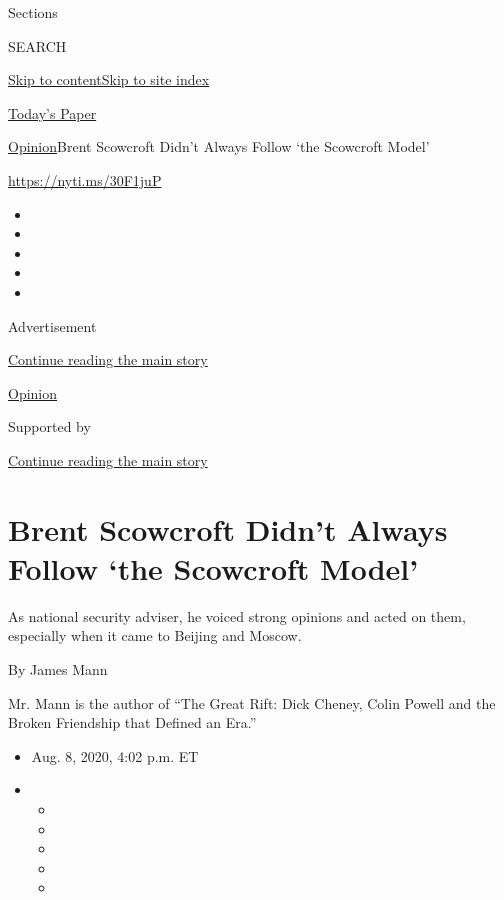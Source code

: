 Sections

SEARCH

\protect\hyperlink{site-content}{Skip to
content}\protect\hyperlink{site-index}{Skip to site index}

\href{https://myaccount.nytimes.com/auth/login?response_type=cookie\&client_id=vi}{}

\href{https://www.nytimes.com/section/todayspaper}{Today's Paper}

\href{/section/opinion}{Opinion}\textbar{}Brent Scowcroft Didn't Always
Follow `the Scowcroft Model'

\href{https://nyti.ms/30F1juP}{https://nyti.ms/30F1juP}

\begin{itemize}
\item
\item
\item
\item
\item
\end{itemize}

Advertisement

\protect\hyperlink{after-top}{Continue reading the main story}

\href{/section/opinion}{Opinion}

Supported by

\protect\hyperlink{after-sponsor}{Continue reading the main story}

\hypertarget{brent-scowcroft-didnt-always-follow-the-scowcroft-model}{%
\section{Brent Scowcroft Didn't Always Follow `the Scowcroft
Model'}\label{brent-scowcroft-didnt-always-follow-the-scowcroft-model}}

As national security adviser, he voiced strong opinions and acted on
them, especially when it came to Beijing and Moscow.

By James Mann

Mr. Mann is the author of ``The Great Rift: Dick Cheney, Colin Powell
and the Broken Friendship that Defined an Era.''

\begin{itemize}
\item
  Aug. 8, 2020, 4:02 p.m. ET
\item
  \begin{itemize}
  \item
  \item
  \item
  \item
  \item
  \end{itemize}
\end{itemize}

